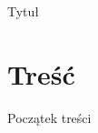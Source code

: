 \documentclass[a4paper, 12pt]{report}
\begin{document}
\begin{titlepage}
    \centering
    {\LARGE Tytuł\par}
\end{titlepage}

\tableofcontents

\newpage
\section{Treść}
Początek treści

{
    \renewcommand{\listfigurename}{\Large Spis rysunków}
    \listoffigures
}

\printbibliography[title={\Large Literatura}]
\end{document}
